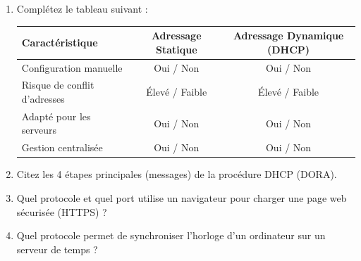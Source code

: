 \documentclass[11pt]{article}
\begin{document}
\begin{exercice}
\begin{enumerate}
    \item Complétez le tableau suivant :
    \begin{center}
    \begin{tabular}{|l|c|c|}
    \hline
    \textbf{Caractéristique} & \textbf{Adressage Statique} & \textbf{Adressage Dynamique (DHCP)} \\
    \hline
    Configuration manuelle & Oui / Non & Oui / Non \\
    \hline
    Risque de conflit d'adresses & Élevé / Faible & Élevé / Faible \\
    \hline
    Adapté pour les serveurs & Oui / Non & Oui / Non \\
    \hline
    Gestion centralisée & Oui / Non & Oui / Non \\
    \hline
    \end{tabular}
    \end{center}
    \item Citez les 4 étapes principales (messages) de la procédure DHCP (DORA).
    \item Quel protocole et quel port utilise un navigateur pour charger une page web sécurisée (HTTPS) ?
    \item Quel protocole permet de synchroniser l'horloge d'un ordinateur sur un serveur de temps ?
\end{enumerate}
\end{exercice}
\end{document}
